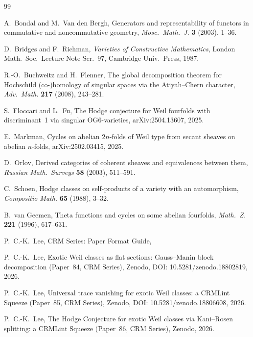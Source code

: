 \documentclass[11pt]{article}
\theoremstyle{plain}
\theoremstyle{definition}
\theoremstyle{remark}
\begin{document}
\begin{thebibliography}{99}

A.~Bondal and M.~Van den Bergh,
Generators and representability of functors in commutative and
noncommutative geometry,
\emph{Mosc.\ Math.\ J.} \textbf{3} (2003), 1--36.

D.~Bridges and F.~Richman,
\emph{Varieties of Constructive Mathematics},
London Math.\ Soc.\ Lecture Note Ser.\ 97, Cambridge Univ.\ Press, 1987.

R.-O.~Buchweitz and H.~Flenner,
The global decomposition theorem for Hochschild (co-)homology of
singular spaces via the Atiyah--Chern character,
\emph{Adv.\ Math.} \textbf{217} (2008), 243--281.

S.~Floccari and L.~Fu,
The Hodge conjecture for Weil fourfolds with discriminant~1 via
singular OG6-varieties,
arXiv:2504.13607, 2025.

E.~Markman,
Cycles on abelian $2n$-folds of Weil type from secant sheaves on
abelian $n$-folds,
arXiv:2502.03415, 2025.

D.~Orlov,
Derived categories of coherent sheaves and equivalences between them,
\emph{Russian Math.\ Surveys} \textbf{58} (2003), 511--591.

C.~Schoen,
Hodge classes on self-products of a variety with an automorphism,
\emph{Compositio Math.} \textbf{65} (1988), 3--32.

B.~van Geemen,
Theta functions and cycles on some abelian fourfolds,
\emph{Math.\ Z.} \textbf{221} (1996), 617--631.

P.~C.-K.\ Lee,
CRM Series: Paper Format Guide,

P.~C.-K.\ Lee,
Exotic Weil classes as flat sections: Gauss--Manin block decomposition
(Paper~84, CRM Series),
Zenodo, DOI: 10.5281/zenodo.18802819, 2026.

P.~C.-K.\ Lee,
Universal trace vanishing for exotic Weil classes: a CRMLint Squeeze
(Paper~85, CRM Series),
Zenodo, DOI: 10.5281/zenodo.18806608, 2026.

P.~C.-K.\ Lee,
The Hodge Conjecture for exotic Weil classes via Kani--Rosen
splitting: a CRMLint Squeeze (Paper~86, CRM Series),
Zenodo, 2026.


\end{thebibliography}
\end{document}
